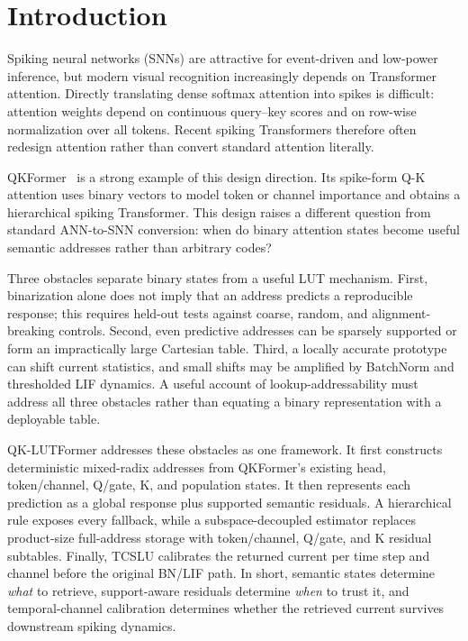 \section{Introduction}
\label{sec:intro}

Spiking neural networks (SNNs) are attractive for event-driven and low-power
inference, but modern visual recognition increasingly depends on Transformer
attention. Directly translating dense softmax attention into spikes is
difficult: attention weights depend on continuous query--key scores and on
row-wise normalization over all tokens. Recent spiking Transformers therefore
often redesign attention rather than convert standard attention literally.

QKFormer~\cite{zhou2024qkformer} is a strong example of this design direction.
Its spike-form Q-K attention uses binary vectors to model token or channel
importance and obtains a hierarchical spiking Transformer. This design raises a
different question from standard ANN-to-SNN conversion: when do binary
attention states become useful semantic addresses rather than arbitrary codes?

Three obstacles separate binary states from a useful LUT mechanism. First,
binarization alone does not imply that an address predicts a reproducible
response; this requires held-out tests against coarse, random, and
alignment-breaking controls. Second, even predictive addresses can be sparsely
supported or form an impractically large Cartesian table. Third, a locally
accurate prototype can shift current statistics, and small shifts may be
amplified by BatchNorm and thresholded LIF dynamics. A useful account of
lookup-addressability must address all three obstacles rather than equating a
binary representation with a deployable table.

QK-LUTFormer addresses these obstacles as one framework. It first constructs
deterministic mixed-radix addresses from QKFormer's existing head,
token/channel, Q/gate, K, and population states. It then represents each
prediction as a global response plus supported semantic residuals. A
hierarchical rule exposes every fallback, while a subspace-decoupled estimator
replaces product-size full-address storage with token/channel, Q/gate, and K
residual subtables. Finally, TCSLU calibrates the returned current per time step
and channel before the original BN/LIF path. In short, semantic states determine
\emph{what} to retrieve, support-aware residuals determine \emph{when} to trust
it, and temporal-channel calibration determines whether the retrieved current
survives downstream spiking dynamics.

